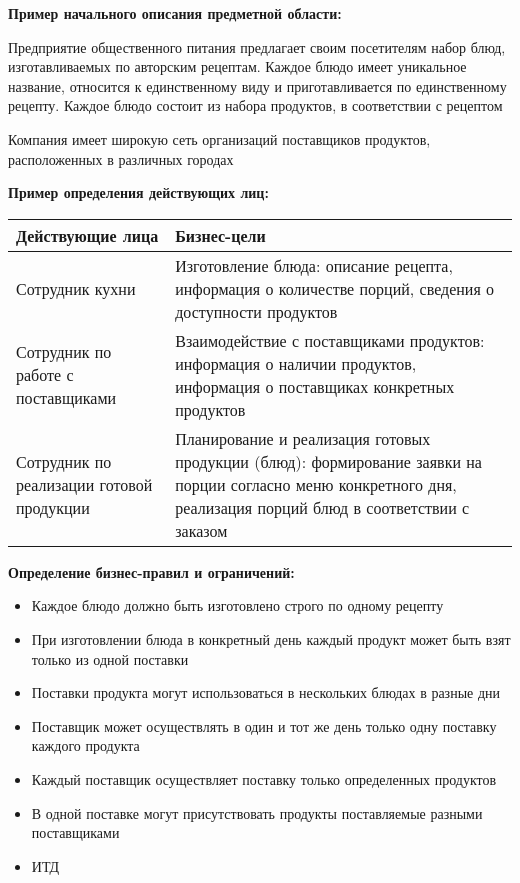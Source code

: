 \documentclass[12pt]{article}
\begin{document}
\begin{Example}{}
    \textbf{Пример начального описания предметной области:}

    Предприятие общественного питания предлагает своим посетителям набор блюд, изготавливаемых по авторским рецептам. Каждое блюдо имеет уникальное название, относится к единственному виду и приготавливается по единственному рецепту. Каждое блюдо состоит из набора продуктов, в соответствии с рецептом 

    Компания имеет широкую сеть организаций поставщиков продуктов, расположенных в различных городах
    
    \textbf{Пример определения действующих лиц:}

    \begin{center}
        \begin{tabular}{|m{13em}|m{22em}|}
            \hline
            Действующие лица & Бизнес-цели \\
            \hline
            Сотрудник кухни & Изготовление блюда: описание рецепта, информация о количестве порций, сведения о доступности продуктов \\
            \hline
            Сотрудник по работе с поставщиками & Взаимодействие с поставщиками продуктов: информация о наличии продуктов, информация о поставщиках конкретных продуктов \\
            \hline
            Сотрудник по реализации готовой продукции & Планирование и реализация готовых продукции (блюд): формирование заявки на порции согласно меню конкретного дня, реализация порций блюд в соответствии с заказом \\
            \hline
        \end{tabular}
    \end{center}

    \textbf{Определение бизнес-правил и ограничений:}
    
    \begin{itemize}
        \item Каждое блюдо должно быть изготовлено строго по одному рецепту 
        \item При изготовлении блюда в конкретный день каждый продукт может быть взят только из одной поставки 
        \item Поставки продукта могут использоваться в нескольких блюдах в разные дни 
        \item Поставщик может осуществлять в один и тот же день только одну поставку каждого продукта 
        \item Каждый поставщик осуществляет поставку только определенных продуктов 
        \item В одной поставке могут присутствовать продукты поставляемые разными поставщиками 
        \item ИТД
    \end{itemize}
\end{Example}
\end{document}
